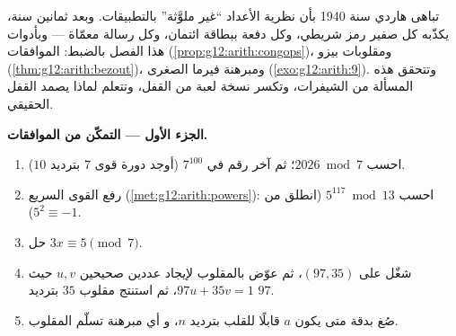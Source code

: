 \begin{problem}
\label{pb:g12:arith:1}
تباهى هاردي سنة 1940 بأن نظرية الأعداد ``غير ملوَّثة''
بالتطبيقات. وبعد ثمانين سنة، يكذّبه كل صفير رمز شريطي، وكل
دفعة ببطاقة ائتمان، وكل رسالة معمّاة
--- وبأدوات هذا الفصل بالضبط: الموافقات
(\cref{prop:g12:arith:congops})، ومقلوبات بيزو
(\cref{thm:g12:arith:bezout})، ومبرهنة فيرما الصغرى
(\cref{exo:g12:arith:9}). وتتحقق هذه المسألة من الشيفرات، وتكسر
نسخة لعبة من القفل، وتتعلم لماذا يصمد القفل الحقيقي.

\medskip
\noindent\textbf{الجزء الأول --- التمكّن من الموافقات.}
\begin{enumerate}
  \item احسب $2026 \bmod 7$؛ ثم آخر رقم في
        $7^{100}$ (أوجد دورة قوى $7$ بترديد
        $10$).
  \item رفع القوى السريع (\cref{met:g12:arith:powers}):
        احسب $5^{117} \bmod 13$ (انطلق من
        $5^2 \equiv -1$).
  \item حل $3x \equiv 5 \pmod 7$.
  \item شغّل  على $(97, 35)$، ثم عوّض بالمقلوب
        لإيجاد عددين صحيحين $u, v$ حيث $97u + 35v = 1$، ثم
        استنتج مقلوب $35$ بترديد $97$.
  \item صُغ بدقة متى يكون $a$ قابلًا للقلب بترديد $n$، و
        أي مبرهنة تسلّم المقلوب.
\end{enumerate}


\end{problem}
